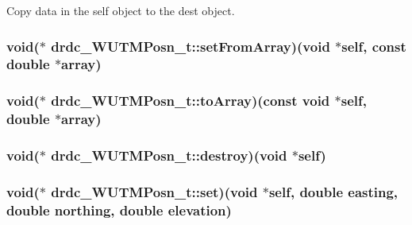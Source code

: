 Copy data in the self object to the dest object. 

\hypertarget{structdrdc__WUTMPosn__t_f59044680829cd0f12c9a3de49911bae}{
\subsubsection[setFromArray]{\setlength{\rightskip}{0pt plus 5cm}void($\ast$ {\bf drdc\_\-WUTMPosn\_\-t::setFromArray})(void $\ast$self, const double $\ast$array)}}
\label{structdrdc__WUTMPosn__t_f59044680829cd0f12c9a3de49911bae}


\hypertarget{structdrdc__WUTMPosn__t_4577590d5ad73c7e7522d38821c5fcc8}{
\subsubsection[toArray]{\setlength{\rightskip}{0pt plus 5cm}void($\ast$ {\bf drdc\_\-WUTMPosn\_\-t::toArray})(const void $\ast$self, double $\ast$array)}}
\label{structdrdc__WUTMPosn__t_4577590d5ad73c7e7522d38821c5fcc8}


\hypertarget{structdrdc__WUTMPosn__t_3e3ff4cfa5adb3de52bd4519d8e3f65b}{
\subsubsection[destroy]{\setlength{\rightskip}{0pt plus 5cm}void($\ast$ {\bf drdc\_\-WUTMPosn\_\-t::destroy})(void $\ast$self)}}
\label{structdrdc__WUTMPosn__t_3e3ff4cfa5adb3de52bd4519d8e3f65b}


\hypertarget{structdrdc__WUTMPosn__t_f532b3b39c957ac058ec88a372a53c3a}{
\subsubsection[set]{\setlength{\rightskip}{0pt plus 5cm}void($\ast$ {\bf drdc\_\-WUTMPosn\_\-t::set})(void $\ast$self, double easting, double northing, double elevation)}}
\label{structdrdc__WUTMPosn__t_f532b3b39c957ac058ec88a372a53c3a}


